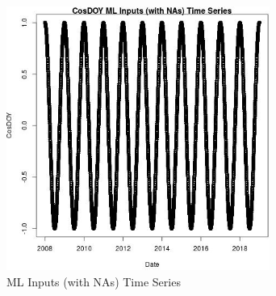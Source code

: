 \begin{figure} 
\centering  
\includegraphics[width=0.77\textwidth]{Code_Outputs/Report_ML_input_PM25_Step4_part_f_de_duplicated_aves_prioritize_24hr_obswNAs_CosDOYvDate.jpg} 
\caption{\label{fig:Report_ML_input_PM25_Step4_part_f_de_duplicated_aves_prioritize_24hr_obswNAsCosDOYvDate}ML Inputs (with NAs) Time Series} 
\end{figure} 
 
